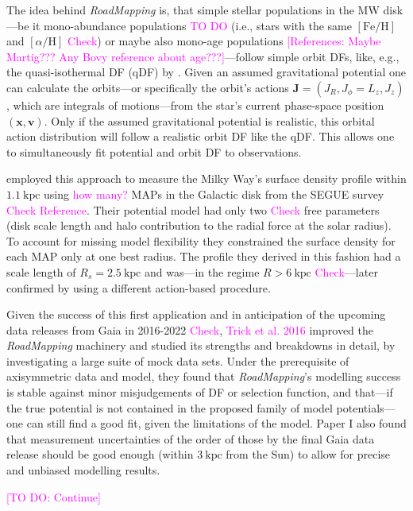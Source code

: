 \documentclass[iop,revtex4,numberedappendix,appendixfloats]{emulateapj}
\newcommand{\vect}[1]{\boldsymbol{#1}}
\newcommand{\RM}{{\sl RoadMapping}}
\newcommand{\Wilma}[1]{\textcolor{Magenta}{#1}}
\begin{document}
The idea behind \RM{} is, that simple stellar populations in the MW disk---be it mono-abundance populations \citep{Bovyabcd, ting} \Wilma{TO DO} (i.e., stars with the same $[\mathrm{Fe}/\mathrm{H}]$ and $[\alpha/\mathrm{H}]$ \Wilma{Check}) or maybe also mono-age populations \Wilma{[References: Maybe Martig??? Any Bovy reference about age???]}---follow simple orbit DFs, like, e.g., the quasi-isothermal DF (qDF) by \citet{???}. Given an assumed gravitational potential one can calculate the orbits---or specifically the orbit's actions $\vect{J}=(J_R,J_\phi=L_z,J_z)$, which are integrals of motions---from the star's current phase-space position $(\vect{x},\vect{v})$. Only if the assumed gravitational potential is realistic, this orbital action distribution will follow a realistic orbit DF like the qDF. This allows one to simultaneously fit potential and orbit DF to observations.

\citet{2013ApJ...779..115B} employed this approach to measure the Milky Way's surface density profile within $1.1~\text{kpc}$ using \Wilma{how many?} MAPs in the Galactic disk from the SEGUE survey \Wilma{Check} \Wilma{Reference}. Their potential model had only two \Wilma{Check} free parameters (disk scale length and halo contribution to the radial force at the solar radius). To account for missing model flexibility they constrained the surface density for each MAP only at one best radius. The profile they derived in this fashion had a scale length of $R_s=2.5~\text{kpc}$ and was---in the regime $R>6~\text{kpc}$ \Wilma{Check}---later confirmed by \citet{2014MNRAS.445.3133P} using a different action-based procedure.

Given the success of this first application and in anticipation of the upcoming data releases from Gaia in 2016-2022 \Wilma{Check}, \Wilma{Trick et al. 2016} improved the \RM{} machinery and studied its strengths and breakdowns in detail, by investigating a large suite of mock data sets. Under the prerequisite of axisymmetric data and model, they found that \RM{}'s modelling success is stable against minor misjudgements of DF or selection function, and that---if the true potential is not contained in the proposed family of model potentials---one can still find a good fit, given the limitations of the model. Paper I also found that measurement uncertainties of the order of those by the final Gaia data release should be good enough (within $3~\text{kpc}$ from the Sun) to allow for precise and unbiased modelling results. 

\Wilma{[TO DO: Continue]}
\end{document}
